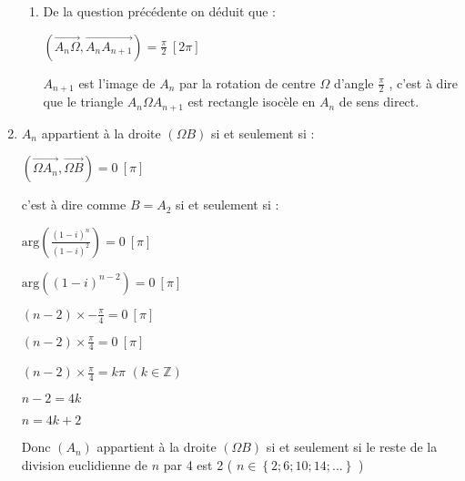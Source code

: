 \begin{corrige}
\begin{enumerate}
\begin{enumerate}[label=\alph*.]
               \item
               De la question précédente on déduit que :
               \par
               $\left(\overrightarrow{A_{n} \Omega }, \overrightarrow{A_{n}A_{n+1}}\right)=\frac{\pi }{2}\ \left[2\pi \right]$
               \par
               $A_{n+1}$ est l'image de $A_{n}$ par la rotation de centre $\Omega $ d'angle $\frac{\pi }{2}$ , c'est à dire que le triangle $A_{n} \Omega  A_{n+1}$ est rectangle isocèle en $A_{n}$ de sens direct.

\begin{center}
\end{center}
          \end{enumerate}
          \item
          $A_{n}$ appartient à la droite $\left(\Omega  B\right)$ si et seulement si :
          \par
          $\left(\overrightarrow{\Omega  A_{n}}, \overrightarrow{\Omega  B}\right)=0 \ \left[\pi \right]$
          \par
          c'est à dire comme $B=A_{2}$ si et seulement si :
          \par
          $\text{arg}\left(\frac{\left(1-i\right)^{n}}{\left(1-i\right)^{2}}\right)=0\ \left[\pi \right]$
          \par
          $\text{arg}\left(\left(1-i\right)^{n-2}\right)=0\ \left[\pi \right]$
          \par
          $\left(n-2\right)\times -\frac{\pi }{4}=0\ \left[\pi \right]$
          \par
          $\left(n-2\right)\times \frac{\pi }{4}=0\ \left[\pi \right]$
          \par
          $\left(n-2\right)\times \frac{\pi }{4}=k\pi $ $\left(k\in \mathbb{Z}\right)$
          \par
          $n-2=4k$
          \par
          $n=4k+2$
          \par
          Donc $\left(A_{n}\right)$ appartient à la droite $\left(\Omega  B\right)$ si et seulement si le reste de la division euclidienne de $n$ par 4 est 2 ( $ n\in \left\{2; 6; 10; 14; . . .\right\} $ )
     \end{enumerate}
\end{corrige}

